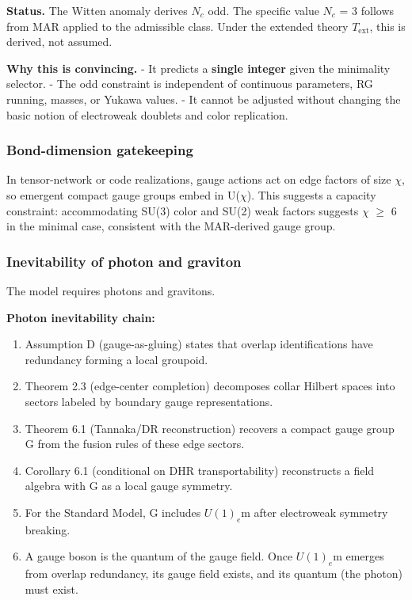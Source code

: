 \documentclass[11pt,a4paper]{article}
\theoremstyle{remark}
\providecommand{\tightlist}{%
  \setlength{\itemsep}{0pt}\setlength{\parskip}{0pt}}
\begin{document}
\textbf{Status.} The Witten anomaly derives \(N_c\) odd. The specific value \(N_c\) = 3
follows from MAR applied to the admissible class. Under the extended theory
\(T_{\mathrm{ext}}\), this is derived, not assumed.

\textbf{Why this is convincing.}
- It predicts a \textbf{single integer} given the minimality selector.
- The odd constraint is independent of continuous parameters, RG running,
masses, or Yukawa values.
- It cannot be adjusted without changing the basic notion of electroweak
doublets and color replication.

\subsubsection{Bond-dimension gatekeeping}\label{bond-dimension-gatekeeping}

In tensor-network or code realizations, gauge actions act on edge factors of
size \ensuremath{\chi}, so emergent compact gauge groups embed in U(\ensuremath{\chi}). This suggests a
capacity constraint: accommodating SU(3) color and SU(2) weak factors suggests
\ensuremath{\chi} \ensuremath{\geq} 6 in the minimal case, consistent with the MAR-derived gauge group.

\subsubsection{Inevitability of photon and graviton}\label{inevitability-of-photon-and-graviton}

The model requires photons and gravitons.

\textbf{Photon inevitability chain:}

\begin{enumerate}
\def\labelenumi{\arabic{enumi}.}
\tightlist
\item
  Assumption D (gauge-as-gluing) states that overlap identifications have
  redundancy forming a local groupoid.
\item
  Theorem 2.3 (edge-center completion) decomposes collar Hilbert spaces into
  sectors labeled by boundary gauge representations.
\item
  Theorem 6.1 (Tannaka/DR reconstruction) recovers a compact gauge group G
  from the fusion rules of these edge sectors.
\item
  Corollary 6.1 (conditional on DHR transportability) reconstructs a field
  algebra with G as a local gauge symmetry.
\item
  For the Standard Model, G includes \(U(1)_e\)m after electroweak symmetry
  breaking.
\item
  A gauge boson is the quantum of the gauge field. Once \(U(1)_e\)m emerges from
  overlap redundancy, its gauge field exists, and its quantum (the photon) must
  exist.
\end{enumerate}
\end{document}

